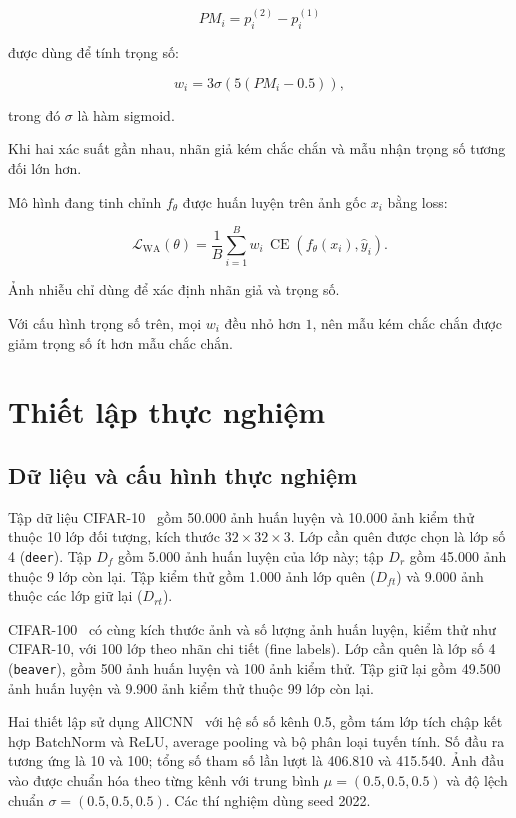 \documentclass[conference]{IEEEtran}
\begin{document}
\[
PM_i = p_i^{(2)} - p_i^{(1)}
\]

được dùng để tính trọng số:

\[
w_i = 3\sigma\!\left(5(PM_i-0.5)\right),
\]

trong đó \(\sigma\) là hàm sigmoid.

Khi hai xác suất gần nhau, nhãn giả kém chắc chắn và mẫu nhận trọng số tương đối lớn hơn.

Mô hình đang tinh chỉnh \(f_\theta\) được huấn luyện trên ảnh gốc \(x_i\) bằng loss:

\[
\mathcal{L}_{\mathrm{WA}}(\theta)
=
\frac{1}{B}
\sum_{i=1}^{B}
w_i\,\operatorname{CE}(f_\theta(x_i),\hat{y}_i).
\]

Ảnh nhiễu chỉ dùng để xác định nhãn giả và trọng số.

Với cấu hình trọng số trên, mọi \(w_i\) đều nhỏ hơn \(1\), nên mẫu kém chắc chắn được giảm trọng số ít hơn mẫu chắc chắn.
\section{Thiết lập thực nghiệm}
\label{sec:protocol}
\subsection{Dữ liệu và cấu hình thực nghiệm}
Tập dữ liệu CIFAR-10~\cite{krizhevsky2009learning} gồm 50.000 ảnh huấn luyện và 10.000 ảnh kiểm thử thuộc 10 lớp đối tượng, kích thước $32\times32\times3$. Lớp cần quên được chọn là lớp số 4 (\texttt{deer}). Tập $D_f$ gồm 5.000 ảnh huấn luyện của lớp này; tập $D_r$ gồm 45.000 ảnh thuộc 9 lớp còn lại. Tập kiểm thử gồm 1.000 ảnh lớp quên ($D_{ft}$) và 9.000 ảnh thuộc các lớp giữ lại ($D_{rt}$).

CIFAR-100~\cite{krizhevsky2009learning} có cùng kích thước ảnh và số lượng ảnh huấn luyện, kiểm thử như CIFAR-10, với 100 lớp theo nhãn chi tiết (fine labels). Lớp cần quên là lớp số 4 (\texttt{beaver}), gồm 500 ảnh huấn luyện và 100 ảnh kiểm thử. Tập giữ lại gồm 49.500 ảnh huấn luyện và 9.900 ảnh kiểm thử thuộc 99 lớp còn lại.

Hai thiết lập sử dụng AllCNN~\cite{springenberg2015allcnn} với hệ số số kênh 0.5, gồm tám lớp tích chập kết hợp BatchNorm và ReLU, average pooling và bộ phân loại tuyến tính. Số đầu ra tương ứng là 10 và 100; tổng số tham số lần lượt là 406.810 và 415.540. Ảnh đầu vào được chuẩn hóa theo từng kênh với trung bình $\mu=(0.5,0.5,0.5)$ và độ lệch chuẩn $\sigma=(0.5,0.5,0.5)$. Các thí nghiệm dùng seed 2022.
\end{document}
